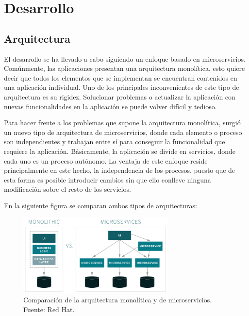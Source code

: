\chapter{Desarrollo} 
\label{sec:desarrollo}

\section{Arquitectura}

El desarrollo se ha llevado a cabo siguiendo un enfoque basado en microservicios. Comúnmente, las aplicaciones presentan una arquitectura monolítica, esto quiere decir que todos los elementos que se implementan se encuentran contenidos en una aplicación individual. Uno de los principales inconvenientes de este tipo de arquitectura es su rigidez. Solucionar problemas o actualizar la aplicación con nuevas funcionalidades en la aplicación se puede volver difícil y tedioso. 

Para hacer frente a los problemas que supone la arquitectura monolítica, surgió un nuevo tipo de arquitectura de microservicios, donde cada elemento o proceso son independientes y trabajan entre sí para conseguir la funcionalidad que requiere la aplicación. Básicamente, la aplicación se divide en servicios, donde cada uno es un proceso autónomo. La ventaja de este enfoque reside principalmente en este hecho, la independencia de los procesos, puesto que de esta forma es posible introducir cambios sin que ello conlleve ninguna modificación sobre el resto de los servicios. 

En la siguiente figura se comparan ambos tipos de arquitecturas:

\begin{figure}[ht]
	\begin{center}
		\includegraphics[width = 0.70\textwidth]{Figuras/microservicios.PNG}
	\end{center}
	\caption{\label{fig:microservicios} Comparación de la arquitectura monolítica y de microservicios. Fuente: Red Hat.}
\end{figure}

